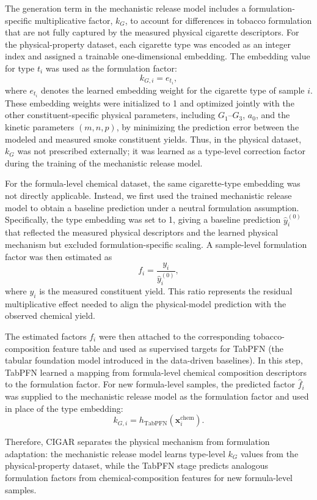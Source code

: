\documentclass[11pt]{article}
\begin{document}
The generation term in the mechanistic release model includes a formulation-specific multiplicative factor, $k_G$, to account for differences in tobacco formulation that are not fully captured by the measured physical cigarette descriptors. For the physical-property dataset, each cigarette type was encoded as an integer index and assigned a trainable one-dimensional embedding. The embedding value for type $t_i$ was used as the formulation factor:
\[
k_{G,i}=e_{t_i},
\]
where $e_{t_i}$ denotes the learned embedding weight for the cigarette type of sample $i$. These embedding weights were initialized to 1 and optimized jointly with the other constituent-specific physical parameters, including $G_1$--$G_3$, $a_0$, and the kinetic parameters $(m,n,p)$, by minimizing the prediction error between the modeled and measured smoke constituent yields. Thus, in the physical dataset, $k_G$ was not prescribed externally; it was learned as a type-level correction factor during the training of the mechanistic release model.

For the formula-level chemical dataset, the same cigarette-type embedding was not directly applicable. Instead, we first used the trained mechanistic release model to obtain a baseline prediction under a neutral formulation assumption. Specifically, the type embedding was set to 1, giving a baseline prediction $\hat{y}_i^{(0)}$ that reflected the measured physical descriptors and the learned physical mechanism but excluded formulation-specific scaling. A sample-level formulation factor was then estimated as
\[
f_i=\frac{y_i}{\hat{y}_i^{(0)}},
\]
where $y_i$ is the measured constituent yield. This ratio represents the residual multiplicative effect needed to align the physical-model prediction with the observed chemical yield.

The estimated factors $f_i$ were then attached to the corresponding tobacco-composition feature table and used as supervised targets for TabPFN (the tabular foundation model introduced in the data-driven baselines). In this step, TabPFN learned a mapping from formula-level chemical composition descriptors to the formulation factor. For new formula-level samples, the predicted factor $\hat{f}_i$ was supplied to the mechanistic release model as the formulation factor and used in place of the type embedding:
\[
k_{G,i} = h_{\mathrm{TabPFN}}(\mathbf{x}_i^{\mathrm{chem}}).
\]

Therefore, CIGAR separates the physical mechanism from formulation adaptation: the mechanistic release model learns type-level $k_G$ values from the physical-property dataset, while the TabPFN stage predicts analogous formulation factors from chemical-composition features for new formula-level samples.
\end{document}

